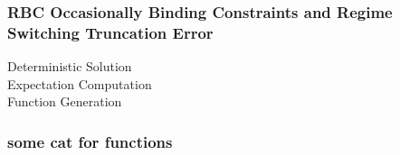 \documentclass[tikz]{beamer}
\begin{document}
\begin{frame}
  \frametitle{RBC Occasionally Binding Constraints and Regime Switching  Truncation Error }
  \begin{description}
  \item[Deterministic Solution] 
  \item[Expectation Computation] 
\item[Function Generation]
  \end{description}

\end{frame}


\begin{frame}[fragile]
  \frametitle{some cat for functions}
\end{frame}




\end{document}
